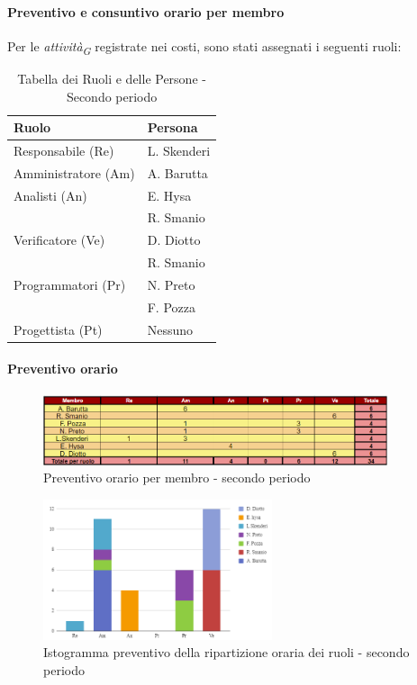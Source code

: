 \paragraph{Preventivo e consuntivo orario per membro}
Per le \textit{attività}\textsubscript{\textit{G}} registrate nei costi, sono stati assegnati i seguenti ruoli:

\begin{table}[H]
    \centering
    \begin{tabular}{|l|l|}
    \hline
    \textbf{Ruolo} & \textbf{Persona} \\
    \hline
    \hline
    Responsabile (Re) & L. Skenderi \\
    \hline
    Amministratore (Am) & A. Barutta \\
    \hline
    Analisti (An) & E. Hysa \\
     & R. Smanio \\
     \hline
    Verificatore (Ve) & D. Diotto \\
     & R. Smanio \\
     \hline
    Programmatori (Pr) & N. Preto \\
     & F. Pozza \\
     \hline
    Progettista (Pt) & Nessuno \\
    \hline
    \end{tabular}
    \caption{Tabella dei Ruoli e delle Persone - Secondo periodo}
    \label{tab:Ruoli_persone_2}
    \end{table}
    

\paragraph*{Preventivo orario} \hspace{1pt}

\begin{figure}[H]
    \centering
    \includegraphics[width=0.9\textwidth]{../Images/preventivoOrario2Periodo.png}
    \caption{Preventivo orario per membro - secondo periodo}
    \label{fig:Preventivo_orario_2}
\end{figure}

\begin{figure}[H]
    \centering
    \includegraphics[width=0.6\textwidth]{../Images/preventivoDivisioneRuoli2Periodo.png}
    \caption{Istogramma preventivo della ripartizione oraria dei ruoli - secondo periodo}
    \label{fig:Preventivo_ripartizione_oraria_2}
\end{figure}

